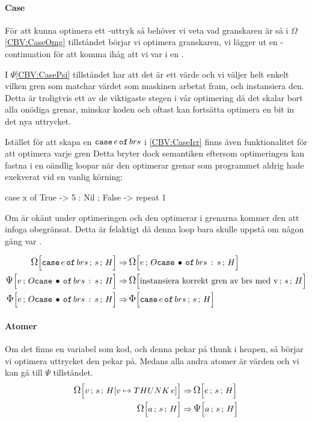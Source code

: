\documentclass[../Optimise]{subfiles}
\begin{document}
\paragraph{Case}
\label{cbv:case}
För att kunna optimera ett -uttryk så behöver vi veta vad granskaren är
så i $\Omega$\eqref{CBV:CaseOmg} tillståndet börjar vi optimera granskaren, vi lägger ut en
-continuation för att komma ihåg att vi var i en .

I $\Psi$\eqref{CBV:CasePsi} tillståndet har att det är ett värde och vi  väljer 
helt enkelt vilken gren som matchar värdet som maskinen arbetat fram, och instansiera den.
Detta är troligtvis ett av de viktigaste stegen i vår optimering då det skalar bort alla onödiga 
grenar, minskar koden och oftast kan fortsätta optimera en bit in det nya uttrycket.

Istället för att skapa en $\eCase e brs$ i \eqref{CBV:CaseIrr} finns även
funktionalitet för att
optimera varje gren Detta bryter dock semantiken eftersom optimeringen kan fastna
i en oändlig loopar när den optimerar grenar som programmet aldrig hade exekverat
vid en vanlig körning: 

\begin{codeEx}
case x of
    { True  -> 5 : Nil
    ; False -> repeat 1
    }
\end{codeEx}

Om  är okänt under optimeringen och den optimerar i grenarna kommer den
att infoga  obegränsat. Detta är felaktigt då denna loop bara skulle uppstå
om  någon gång var .

\begin{align}
\label{CBV:CaseOmg} \OMEGA sH{\eCase e{brs}} \Rightarrow &\, \OMEGA{\oCase{brs}s}He\\
\label{CBV:CasePsi} \PSI{\oCase{brs}s}Hv \Rightarrow &\, \OMEGA sH{\text{instansiera korrekt gren av brs med v}} \\
\label{CBV:CaseIrr} \IRR{\oCase{brs}s}He \Rightarrow &\, \IRR sH{\eCase e brs}
\end{align}


\paragraph{Atomer}
Om det finns en variabel som kod, och denna pekar på thunk i heapen, så börjar vi
optimera uttrycket den pekar på. Medans alla andra atomer är värden och vi kan gå
till $\Psi$ tillståndet.
\begin{align}
\OMEGA s{\heap{v}{\THUNK{e}}}v \Rightarrow &\, \OMEGA sHe \\
\OMEGA sHa \Rightarrow &\, \PSI sHa
\end{align}
\end{document}
